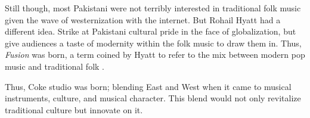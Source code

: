 \documentclass{article}
\begin{document}
  Still though, most Pakistani were not terribly interested in traditional folk 
  music given the wave of westernization with the internet. But Rohail Hyatt had a 
  different idea. Strike at Pakistani cultural pride in the face of globalization, but 
  give audiences a taste of modernity within the folk music to draw them in. Thus, 
  \textit{Fusion} was born, a term coined by Hyatt to refer to the mix between modern pop music
  and traditional folk \autocite{dhanwani2014coke}.

  Thus, Coke studio was born; blending East and West when it came to musical instruments, culture,
  and musical character. This blend would not only revitalize traditional culture but innovate on it. 

  \nocite{*}
  \printbibliography
\end{document}
